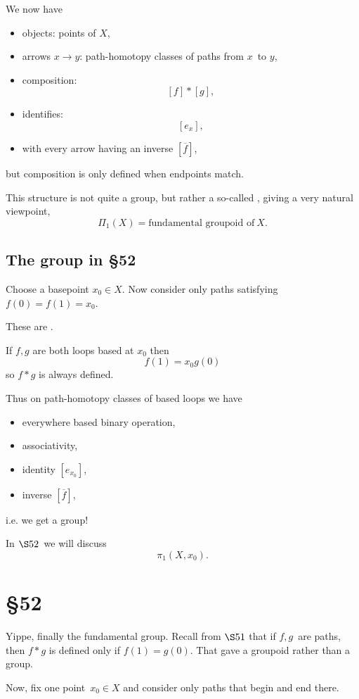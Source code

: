 \documentclass[11pt]{article}
\begin{document}
We now have 
\begin{itemize}
    \item objects: points of $X$, 
    \item arrows $x\to y$: path-homotopy classes of paths 
        from $x$ to $y$, 
    \item composition: 
        \[
            [f] * [g], 
        \]
    \item identifies: 
        \[
            [e_{x}], 
        \]
    \item with every arrow having an inverse $[\overline f]$,
\end{itemize}
but composition is only defined when 
endpoints match. 

This structure is not quite a group, but rather a 
so-called , giving 
a very natural viewpoint, 
\[
    \Pi_1(X) = \text{fundamental groupoid of} \ X. 
\]

\subsection{The group in \S52}
Choose a basepoint $x_0 \in X$. 
Now consider only paths satisfying 
$f(0) = f(1) = x_0$. 

These are .

If $f,g$ are both loops based at $x_0$ then 
\[
    f(1) = x_0 g(0)
\]
so $f * g$ is always defined. 

Thus on path-homotopy classes of based loops we have 
\begin{itemize}
    \item everywhere based binary operation, 
    \item associativity, 
    \item identity $[e_{x_0}]$, 
    \item inverse $[\overline f]$, 
\end{itemize}
i.e. we get a group!

In $\S52$ we will discuss  
\[
    \pi_1(X,x_0).
\]

\section{\S 52}

Yippe, finally the fundamental group.
Recall from $\S 51$ that if $f,g$ are paths, then 
$f * g$ is defined only if $f(1) = g(0)$. 
That gave a groupoid rather than a group.

Now, fix one point $x_0 \in X$ and consider only 
paths that begin and end there.
\end{document}
